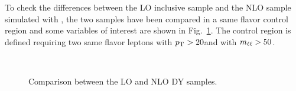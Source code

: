 To check the differences between the LO inclusive sample and the NLO sample simulated with \MCATNLO, the two samples have been compared in a same flavor control region and some variables of interest are shown in Fig.~\ref{fig:LOvsNLO}. The control region is defined requiring two same flavor leptons with $p_{\mathrm{T}} > 20$\GeV and with $m_{\ell\ell} > 50$\GeV.
\begin{figure}[htbp]
\centering
{}
\\
\caption{
    Comparison between the LO and NLO DY samples.}
    \label{fig:LOvsNLO}
\end{figure}
